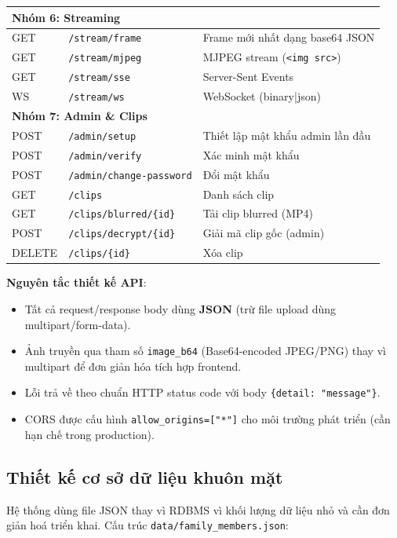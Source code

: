 \begin{longtable}{|p{}|p{}|p{}|}
\hline
\multicolumn{3}{|l|}{\textbf{Nhóm 6: Streaming}} \\
\hline
GET & \texttt{/stream/frame} & Frame mới nhất dạng base64 JSON \\
GET & \texttt{/stream/mjpeg} & MJPEG stream (\texttt{<img src>}) \\
GET & \texttt{/stream/sse} & Server-Sent Events \\
WS & \texttt{/stream/ws} & WebSocket (binary|json) \\
\hline
\multicolumn{3}{|l|}{\textbf{Nhóm 7: Admin \& Clips}} \\
\hline
POST & \texttt{/admin/setup} & Thiết lập mật khẩu admin lần đầu \\
POST & \texttt{/admin/verify} & Xác minh mật khẩu \\
POST & \texttt{/admin/change-password} & Đổi mật khẩu \\
GET & \texttt{/clips} & Danh sách clip \\
GET & \texttt{/clips/blurred/\{id\}} & Tải clip blurred (MP4) \\
POST & \texttt{/clips/decrypt/\{id\}} & Giải mã clip gốc (admin) \\
DELETE & \texttt{/clips/\{id\}} & Xóa clip \\
\hline
\end{longtable}

\medskip
\textbf{Nguyên tắc thiết kế API}:
\begin{itemize}
    \item Tất cả request/response body dùng \textbf{JSON} (trừ file upload dùng multipart/form-data).
    \item Ảnh truyền qua tham số \texttt{image\_b64} (Base64-encoded JPEG/PNG) thay vì multipart để đơn giản hóa tích hợp frontend.
    \item Lỗi trả về theo chuẩn HTTP status code với body \texttt{\{detail: "message"\}}.
    \item CORS được cấu hình \texttt{allow\_origins=["*"]} cho môi trường phát triển (cần hạn chế trong production).
\end{itemize}

\subsection{Thiết kế cơ sở dữ liệu khuôn mặt}
\label{subsec:facedb}

Hệ thống dùng file JSON thay vì RDBMS vì khối lượng dữ liệu nhỏ và cần đơn giản hoá triển khai. Cấu trúc \texttt{data/family\_members.json}:


